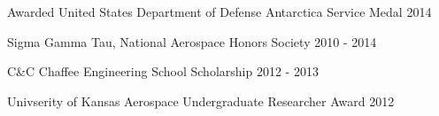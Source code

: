 
\begin{cvhonors}

  \cvhonor
    {Awarded United States Department of Defense Antarctica Service Medal} %
    {2014} %

  \cvhonor
    {Sigma Gamma Tau, National Aerospace Honors Society} %
    {2010 - 2014} %

  \cvhonor
    {C\&C Chaffee Engineering School Scholarship} %
    {2012 - 2013} %

  \cvhonor
    {Univserity of Kansas Aerospace Undergraduate Researcher Award} %
    {2012} %

\end{cvhonors}
